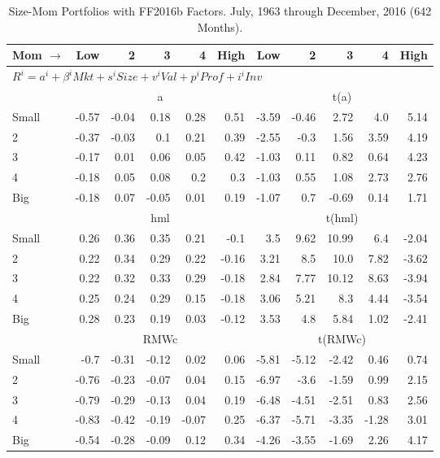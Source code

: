 
\begin{table}[!ht]
\centering
\caption{Size-Mom Portfolios with FF2016b Factors. \footnotesize{July, 1963 through December, 2016 (642 Months).}}
\begin{tabular}{lrrrrrrrrrr}
  \toprule
  Mom $\rightarrow$ & Low & 2 & 3 & 4 & High & Low & 2 & 3 & 4 & High \\ 
  \toprule
  \multicolumn{9}{l}{$R^i=a^i+\beta^iMkt+s^iSize+v^iVal+p^iProf+i^iInv$} \\

  

      & \multicolumn{5}{c}{a} & \multicolumn{5}{c}{t(a)} \\
    \cmidrule(r){2-6} \cmidrule(r){7-11}
      Small  & -0.57  & -0.04  & 0.18  & 0.28  & 0.51   & -3.59  & -0.46  & 2.72  & 4.0  & 5.14  \\
          2  & -0.37  & -0.03  & 0.1  & 0.21  & 0.39   & -2.55  & -0.3  & 1.56  & 3.59  & 4.19  \\
          3  & -0.17  & 0.01  & 0.06  & 0.05  & 0.42   & -1.03  & 0.11  & 0.82  & 0.64  & 4.23  \\
          4  & -0.18  & 0.05  & 0.08  & 0.2  & 0.3   & -1.03  & 0.55  & 1.08  & 2.73  & 2.76  \\
      Big    & -0.18  & 0.07  & -0.05  & 0.01  & 0.19   & -1.07  & 0.7  & -0.69  & 0.14  & 1.71  \\


      & \multicolumn{5}{c}{hml} & \multicolumn{5}{c}{t(hml)} \\
    \cmidrule(r){2-6} \cmidrule(r){7-11}
      Small  & 0.26  & 0.36  & 0.35  & 0.21  & -0.1   & 3.5  & 9.62  & 10.99  & 6.4  & -2.04  \\
          2  & 0.22  & 0.34  & 0.29  & 0.22  & -0.16   & 3.21  & 8.5  & 10.0  & 7.82  & -3.62  \\
          3  & 0.22  & 0.32  & 0.33  & 0.29  & -0.18   & 2.84  & 7.77  & 10.12  & 8.63  & -3.94  \\
          4  & 0.25  & 0.24  & 0.29  & 0.15  & -0.18   & 3.06  & 5.21  & 8.3  & 4.44  & -3.54  \\
      Big    & 0.28  & 0.23  & 0.19  & 0.03  & -0.12   & 3.53  & 4.8  & 5.84  & 1.02  & -2.41  \\

  

      & \multicolumn{5}{c}{RMWc} & \multicolumn{5}{c}{t(RMWc)} \\
    \cmidrule(r){2-6} \cmidrule(r){7-11}
      Small  & -0.7  & -0.31  & -0.12  & 0.02  & 0.06   & -5.81  & -5.12  & -2.42  & 0.46  & 0.74  \\
          2  & -0.76  & -0.23  & -0.07  & 0.04  & 0.15   & -6.97  & -3.6  & -1.59  & 0.99  & 2.15  \\
          3  & -0.79  & -0.29  & -0.13  & 0.04  & 0.19   & -6.48  & -4.51  & -2.51  & 0.83  & 2.56  \\
          4  & -0.83  & -0.42  & -0.19  & -0.07  & 0.25   & -6.37  & -5.71  & -3.35  & -1.28  & 3.01  \\
      Big    & -0.54  & -0.28  & -0.09  & 0.12  & 0.34   & -4.26  & -3.55  & -1.69  & 2.26  & 4.17  \\


\end{tabular}
\end{table}
